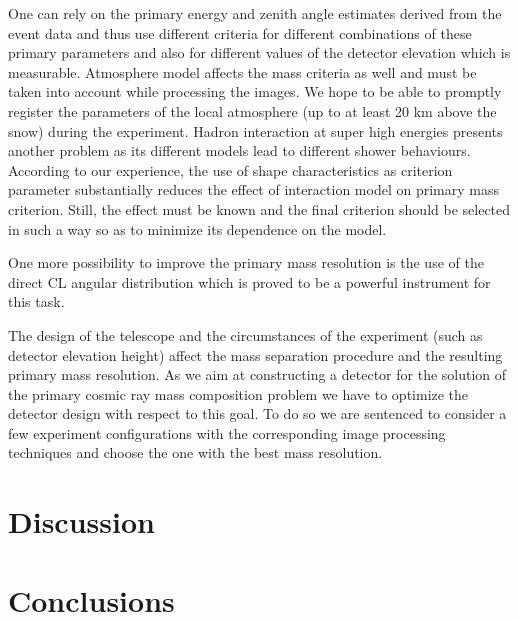 \documentclass[a4paper,11pt]{article}
\begin{document}
One can rely on the primary energy and zenith angle estimates derived from the event data and thus use different criteria for different combinations of these primary parameters and also for different values of the detector elevation which is measurable. Atmosphere model affects the mass criteria as well and must be taken into account while processing the images.
We hope to be able to promptly register the parameters of the local atmosphere (up to at least 20 km above the snow) during the experiment. Hadron interaction at super high energies presents another problem as its different models lead to different shower behaviours. According to our experience, the use of shape characteristics as criterion parameter substantially reduces the effect of interaction model on primary mass criterion. Still, the effect must be known and the final criterion should be selected in such a way so as to minimize its dependence on the model.

One more possibility to improve the primary mass resolution is the use of the direct CL angular distribution which is proved to be a powerful instrument for this task.

The design of the telescope and the circumstances of the experiment (such as detector elevation height) affect the mass separation procedure and the resulting primary mass resolution. As we aim at constructing a detector for the solution of the primary cosmic ray mass composition problem we have to optimize the detector design with respect to this goal. To do so we are sentenced to consider a few experiment configurations with the corresponding image processing techniques and choose the one with the best mass resolution.


\section{Discussion}

\section{Conclusions}

\acknowledgments
{}



\end{document}
